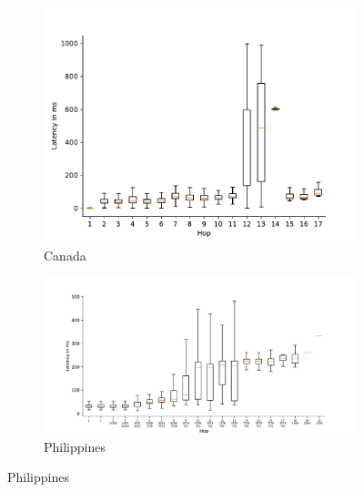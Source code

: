 \begin{figure}
	\centering
	\begin{subfigure}[b]{\linewidth}
		\includegraphics[width=\linewidth]{chapters/4-results/traceroute/img/latency-per-hop-CA.pdf}
		\caption{Canada}
	\end{subfigure}
	\begin{subfigure}[b]{\linewidth}
		\includegraphics[width=\linewidth]{chapters/4-results/traceroute/img/latency-per-hop-PH.pdf}
		\caption{Philippines}
	\end{subfigure}
\end{figure}

